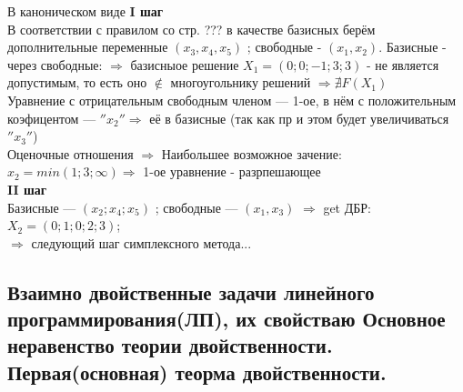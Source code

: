 В каноническом виде 
\textbf{I шаг}\\
В соответствии с правилом со стр. ??? в качестве базисных берём дополнительные переменные $(x_3, x_4, x_5)$ ; свободные - $(x_1, x_2)$. Базисные - через свободные:
 $\Rightarrow$ базисныое решение $X_1 = (0;0;-1;3;3)$ - не является допустимым, то есть оно $\notin$ многоугольнику решений $\Rightarrow \nexists F(X_1)$ \\
Уравнение с отрицательным свободным членом --- 1-ое, в нём с положительным коэфицентом --- $''x_2'' \Rightarrow $ её в базисные (так как пр и этом будет увеличиваться $''x_3''$) \\
Оценочные отношения $\Rightarrow$ Наибольшее возможное зачение: $x_2 = min (1;3; \infty ) \Rightarrow$ 1-ое уравнение - разрпешающее \\
\textbf{II шаг}\\
Базисные --- $(x_2; x_4; x_5)$ ; свободные --- $(x_1, x_3)$
$\Rightarrow$ get ДБР: $X_2=(0;1;0;2;3)$; \\
$\Rightarrow$ следующий шаг симплексного метода...
\subsection{Взаимно двойственные задачи линейного программирования(ЛП), их свойстваю Основное неравенство теории двойственности. Первая(основная) теорма двойственности.}
